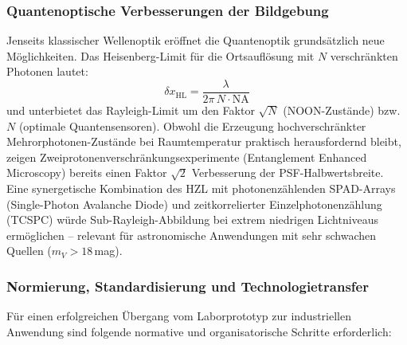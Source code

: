﻿\documentclass[12pt,a4paper]{article}
\theoremstyle{definition}
\begin{document}
	\subsubsection{Quantenoptische Verbesserungen der Bildgebung}

	Jenseits klassischer Wellenoptik eröffnet die Quantenoptik
	grundsätzlich neue Möglichkeiten.  Das Heisenberg-Limit für die
	Ortsauflösung mit $N$ verschränkten Photonen lautet:
	\begin{equation}
		\delta x_\mathrm{HL}
		= \frac{\lambda}{2\pi\,N\cdot\mathrm{NA}}
		\label{eq:heisenberg_limit}
	\end{equation}
	und unterbietet das Rayleigh-Limit um den Faktor $\sqrt{N}$
	(NOON-Zustände) bzw.\ $N$ (optimale Quantensensoren).  Obwohl
	die Erzeugung hochverschränkter Mehrorphotonen-Zustände bei
	Raumtemperatur praktisch herausfordernd bleibt, zeigen
	Zweiprotonenverschränkungsexperimente (Entanglement Enhanced
	Microscopy) bereits einen Faktor $\sqrt{2}$ Verbesserung der
	PSF-Halbwertsbreite.  Eine synergetische Kombination des HZL
	mit photonenzählenden SPAD-Arrays (Single-Photon Avalanche Diode)
	und zeitkorrelierter Einzelphotonenzählung (TCSPC) würde
	Sub-Rayleigh-Abbildung bei extrem niedrigen Lichtniveaus
	ermöglichen -- relevant für astronomische Anwendungen mit
	sehr schwachen Quellen ($m_V > 18$\,mag).

	\subsubsection{Normierung, Standardisierung und Technologietransfer}

	Für einen erfolgreichen Übergang vom Laborprototyp zur industriellen
	Anwendung sind folgende normative und organisatorische Schritte
	erforderlich:
\end{document}
